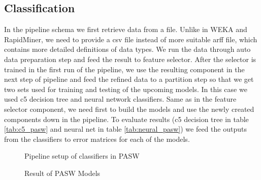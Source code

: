 \documentclass[11pt]{article}
\begin{document}
\subsection{Classification}
In the pipeline schema we first retrieve data from a file. Unlike in WEKA and
RapidMiner, we need to provide a csv file instead of more suitable arff file,
which contains more detailed definitions of data types. We run the data through
auto data preparation step and feed the result to feature selector. After the
selector is trained in the first run of the pipeline, we use the resulting
component in the next step of pipeline and feed the refined data to a partition
step so that we get two sets used for training and testing of the upcoming
models. In this case we used c5 decision tree and neural network classifiers.
Same as in the feature selector component, we need first to build the models
and use the newly created components down in the pipeline. To evaluate results
(c5 decision tree in table \ref{tab:c5_pasw} and neural net in table
\ref{tab:neural_pasw}) we feed the outputs from the classifiers to error
matrices for each of the models.


\begin{figure}[!ht]
	\centering
    \caption{Pipeline setup of classifiers in PASW}

\end{figure}

\begin{figure}[!ht]
	\centering
    \caption{Result of PASW Models}
\end{figure}
\end{document}
